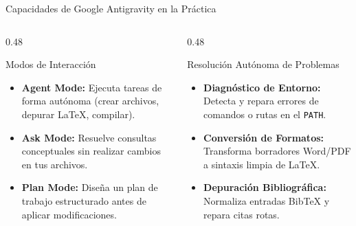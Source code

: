 \documentclass[aspectratio=169, 10pt]{beamer}
\begin{document}
\begin{frame}{Capacidades de Google Antigravity en la Práctica}
  \begin{columns}[T]
    \begin{column}{0.48\textwidth}
      \begin{block}{Modos de Interacción}
        \small
        \begin{itemize}
          \item \textbf{Agent Mode:} Ejecuta tareas de forma autónoma (crear archivos, depurar \LaTeX, compilar).
          \item \textbf{Ask Mode:} Resuelve consultas conceptuales sin realizar cambios en tus archivos.
          \item \textbf{Plan Mode:} Diseña un plan de trabajo estructurado antes de aplicar modificaciones.
        \end{itemize}
      \end{block}
    \end{column}

    \begin{column}{0.48\textwidth}
      \begin{block}{Resolución Autónoma de Problemas}
        \small
        \begin{itemize}
          \item \textbf{Diagnóstico de Entorno:} Detecta y repara errores de comandos o rutas en el \texttt{PATH}.
          \item \textbf{Conversión de Formatos:} Transforma borradores Word/PDF a sintaxis limpia de \LaTeX.
          \item \textbf{Depuración Bibliográfica:} Normaliza entradas BibTeX y repara citas rotas.
        \end{itemize}
      \end{block}
    \end{column}
  \end{columns}
\end{frame}
\end{document}
